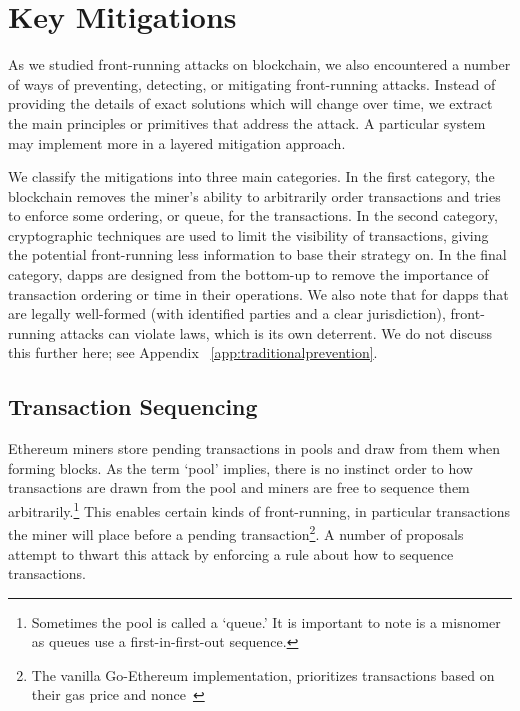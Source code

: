 \section{Key Mitigations} %




As we studied front-running attacks on blockchain, we also encountered a number of ways of preventing, detecting, or mitigating front-running attacks. Instead of providing the details of exact solutions which will change over time, we extract the main principles or primitives that address the attack. A particular system may implement more in a layered mitigation approach.

We classify the mitigations into three main categories. In the first category, the blockchain removes the miner's ability to arbitrarily order transactions and tries to enforce some ordering, or queue, for the transactions. In the second category, cryptographic techniques are used to limit the visibility of transactions, giving the potential front-running less information to base their strategy on. In the final category, dapps are designed from the bottom-up to remove the importance of transaction ordering or time in their operations. We also note that for dapps that are legally well-formed (\eg with identified parties and a clear jurisdiction), front-running attacks can violate laws, which is its own deterrent. We do not discuss this further here; see Appendix ~\ref{app:traditionalprevention}.

\subsection{Transaction Sequencing}

Ethereum miners store pending transactions in pools and draw from them when forming blocks. As the term `pool' implies, there is no instinct order to how transactions are drawn from the pool and miners are free to sequence them arbitrarily.\footnote{Sometimes the pool is called a `queue.' It is important to note is a misnomer as queues use a first-in-first-out sequence.} This enables certain kinds of front-running, in particular transactions the miner will place before a pending transaction\footnote{The vanilla Go-Ethereum implementation, prioritizes transactions based on their gas price and nonce~\cite{EthMinerTxOrder}}. A number of proposals attempt to thwart this attack by enforcing a rule about how to sequence transactions.

